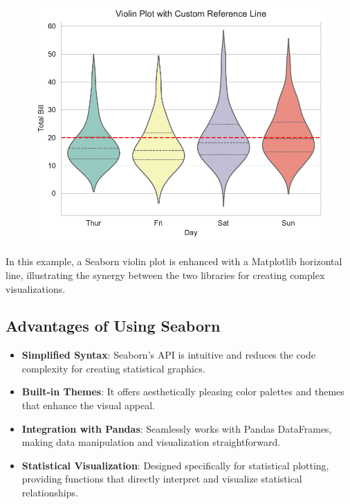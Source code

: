 \documentclass[
  letterpaper,
  DIV=11,
  numbers=noendperiod]{scrreprt}
\providecommand{\tightlist}{%
  \setlength{\itemsep}{0pt}\setlength{\parskip}{0pt}}\usepackage{longtable,booktabs,array}
\begin{document}
\begin{figure}[H]

{\centering \includegraphics{15_Data_Vis_files/figure-pdf/cell-18-output-2.pdf}

}

\end{figure}

In this example, a Seaborn violin plot is enhanced with a Matplotlib
horizontal line, illustrating the synergy between the two libraries for
creating complex visualizations.

\hypertarget{advantages-of-using-seaborn}{%
\subsection{Advantages of Using
Seaborn}\label{advantages-of-using-seaborn}}

\begin{itemize}
\tightlist
\item
  \textbf{Simplified Syntax}: Seaborn's API is intuitive and reduces the
  code complexity for creating statistical graphics.
\item
  \textbf{Built-in Themes}: It offers aesthetically pleasing color
  palettes and themes that enhance the visual appeal.
\item
  \textbf{Integration with Pandas}: Seamlessly works with Pandas
  DataFrames, making data manipulation and visualization
  straightforward.
\item
  \textbf{Statistical Visualization}: Designed specifically for
  statistical plotting, providing functions that directly interpret and
  visualize statistical relationships.
\end{itemize}
\end{document}
